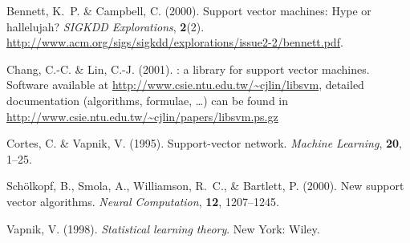 \documentclass[a4paper]{article}
\begin{document}
\begin{thebibliography}{5}

Bennett, K.~P. \& Campbell, C. (2000).
\newblock Support vector machines: Hype or hallelujah?
\newblock \emph{SIGKDD Explorations}, \textbf{2}(2).
\newblock
  \url{http://www.acm.org/sigs/sigkdd/explorations/issue2-2/bennett.pdf}.

Chang, C.-C. \& Lin, C.-J. (2001).
: a library for support vector machines.
\newblock Software available at
\url{http://www.csie.ntu.edu.tw/~cjlin/libsvm}, detailed documentation
(algorithms, formulae, \dots) can be found
in \url{http://www.csie.ntu.edu.tw/~cjlin/papers/libsvm.ps.gz}

Cortes, C. \& Vapnik, V. (1995).
\newblock Support-vector network.
\newblock \emph{Machine Learning}, \textbf{20}, 1--25.

Sch\"olkopf, B., Smola, A., Williamson, R.~C., \& Bartlett, P. (2000).
\newblock New support vector algorithms.
\newblock \emph{Neural Computation}, \textbf{12}, 1207--1245.

Vapnik, V. (1998).
\newblock \emph{Statistical learning theory}.
\newblock New York: Wiley.

\end{thebibliography}
\end{document}
